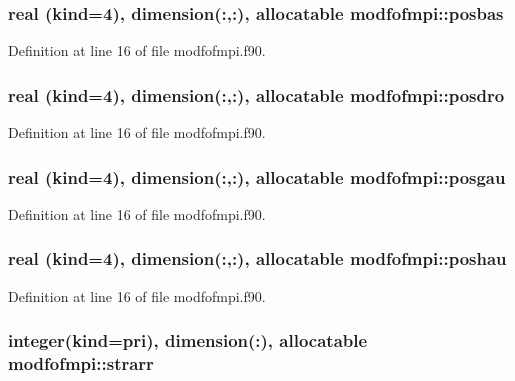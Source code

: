 \hypertarget{classmodfofmpi_abd8afe0852ff1d0298955d285cb4f001}{
\subsubsection[{posbas}]{\setlength{\rightskip}{0pt plus 5cm}real (kind=4), dimension(\-:,\-:), allocatable modfofmpi\-::posbas}}\label{classmodfofmpi_abd8afe0852ff1d0298955d285cb4f001}


Definition at line 16 of file modfofmpi.\-f90.

\hypertarget{classmodfofmpi_a1ca3754d2490a28a6596589818c19aba}{
\subsubsection[{posdro}]{\setlength{\rightskip}{0pt plus 5cm}real (kind=4), dimension(\-:,\-:), allocatable modfofmpi\-::posdro}}\label{classmodfofmpi_a1ca3754d2490a28a6596589818c19aba}


Definition at line 16 of file modfofmpi.\-f90.

\hypertarget{classmodfofmpi_a420a314f84492aec68a773c09730981d}{
\subsubsection[{posgau}]{\setlength{\rightskip}{0pt plus 5cm}real (kind=4), dimension(\-:,\-:), allocatable modfofmpi\-::posgau}}\label{classmodfofmpi_a420a314f84492aec68a773c09730981d}


Definition at line 16 of file modfofmpi.\-f90.

\hypertarget{classmodfofmpi_a940b15087397a154e933785ff862d1aa}{
\subsubsection[{poshau}]{\setlength{\rightskip}{0pt plus 5cm}real (kind=4), dimension(\-:,\-:), allocatable modfofmpi\-::poshau}}\label{classmodfofmpi_a940b15087397a154e933785ff862d1aa}


Definition at line 16 of file modfofmpi.\-f90.

\hypertarget{classmodfofmpi_adc11b8c24e402c222ddf9d339aece63c}{
\subsubsection[{strarr}]{\setlength{\rightskip}{0pt plus 5cm}integer(kind=pri), dimension(\-:), allocatable modfofmpi\-::strarr}}\label{classmodfofmpi_adc11b8c24e402c222ddf9d339aece63c}



